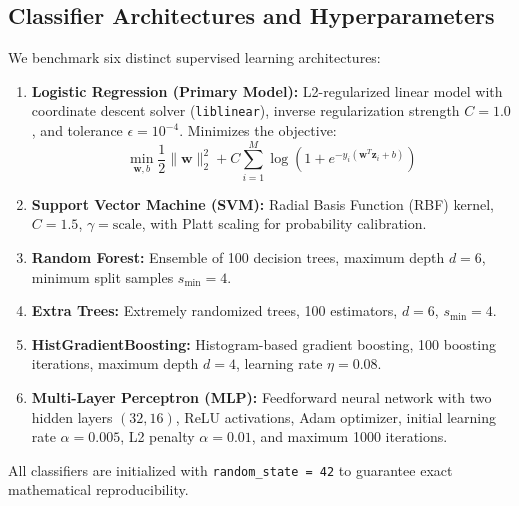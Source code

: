 \documentclass[conference]{IEEEtran}
\begin{document}
\subsection{Classifier Architectures and Hyperparameters}
We benchmark six distinct supervised learning architectures:
\begin{enumerate}
    \item \textbf{Logistic Regression (Primary Model):} L2-regularized linear model with coordinate descent solver (\texttt{liblinear}), inverse regularization strength $C = 1.0$, and tolerance $\epsilon = 10^{-4}$. Minimizes the objective:
    \begin{equation}
        \min_{\mathbf{w}, b} \frac{1}{2} \|\mathbf{w}\|_2^2 + C \sum_{i=1}^{M} \log\left(1 + e^{-y_i (\mathbf{w}^T \mathbf{z}_i + b)}\right)
        \label{eq:logreg_loss}
    \end{equation}
    \item \textbf{Support Vector Machine (SVM):} Radial Basis Function (RBF) kernel, $C = 1.5$, $\gamma = \text{scale}$, with Platt scaling for probability calibration.
    \item \textbf{Random Forest:} Ensemble of 100 decision trees, maximum depth $d = 6$, minimum split samples $s_{\min} = 4$.
    \item \textbf{Extra Trees:} Extremely randomized trees, 100 estimators, $d = 6$, $s_{\min} = 4$.
    \item \textbf{HistGradientBoosting:} Histogram-based gradient boosting, 100 boosting iterations, maximum depth $d = 4$, learning rate $\eta = 0.08$.
    \item \textbf{Multi-Layer Perceptron (MLP):} Feedforward neural network with two hidden layers $(32, 16)$, ReLU activations, Adam optimizer, initial learning rate $\alpha = 0.005$, L2 penalty $\alpha = 0.01$, and maximum 1000 iterations.
\end{enumerate}

All classifiers are initialized with \texttt{random\_state = 42} to guarantee exact mathematical reproducibility.
\end{document}
